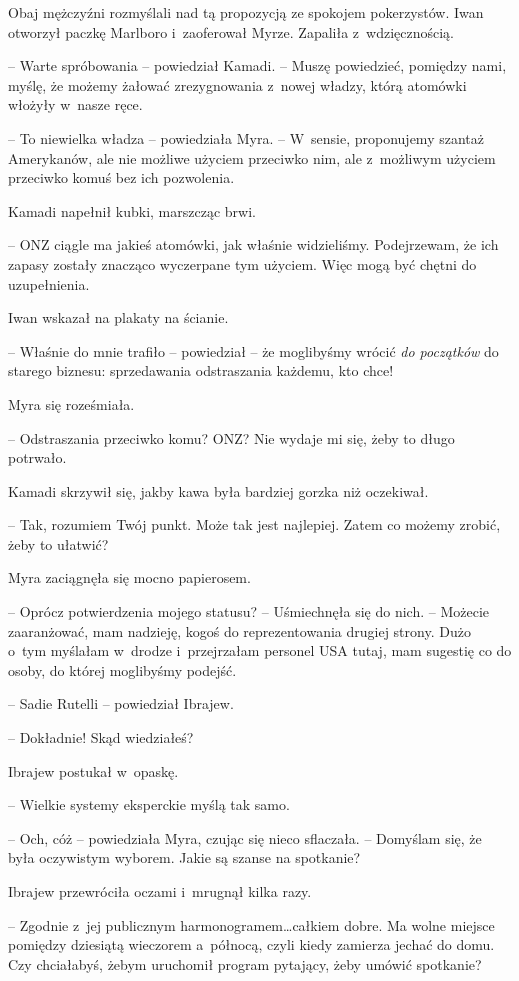 \documentclass[oneside,polish,11pt,sfheadings]{mwbk}
\begin{document}
Obaj mężczyźni rozmyślali nad tą propozycją ze spokojem pokerzystów.
Iwan otworzył paczkę Marlboro i~zaoferował Myrze. Zapaliła z~wdzięcznością.

-- Warte spróbowania -- powiedział Kamadi. -- Muszę powiedzieć, pomiędzy
nami, myślę, że możemy żałować zrezygnowania z~nowej władzy, którą
atomówki włożyły w~nasze ręce.

-- To niewielka władza -- powiedziała Myra. -- W~sensie, proponujemy
szantaż Amerykanów, ale nie możliwe użyciem przeciwko nim, ale z~możliwym użyciem przeciwko komuś bez ich pozwolenia.

Kamadi napełnił kubki, marszcząc brwi. 

-- ONZ ciągle ma jakieś atomówki,
jak właśnie widzieliśmy. Podejrzewam, że ich zapasy zostały znacząco
wyczerpane tym użyciem. Więc mogą być chętni do uzupełnienia.

Iwan wskazał na plakaty na ścianie. 

-- Właśnie do mnie trafiło -- powiedział -- że moglibyśmy wrócić \textit{do początków} do starego
biznesu: sprzedawania odstraszania każdemu, kto chce!

Myra się roześmiała. 

-- Odstraszania przeciwko komu? ONZ? Nie wydaje mi
się, żeby to długo potrwało.

Kamadi skrzywił się, jakby kawa była bardziej gorzka niż oczekiwał. 

-- Tak, rozumiem Twój punkt. Może tak jest najlepiej. Zatem co możemy
zrobić, żeby to ułatwić?

Myra zaciągnęła się mocno papierosem. 

-- Oprócz potwierdzenia mojego
statusu? -- Uśmiechnęła się do nich. -- Możecie zaaranżować, mam nadzieję,
kogoś do reprezentowania drugiej strony. Dużo o~tym myślałam w~drodze i~przejrzałam personel USA tutaj, mam sugestię co do osoby, do której
moglibyśmy podejść.

-- Sadie Rutelli -- powiedział Ibrajew.

-- Dokładnie! Skąd wiedziałeś?

Ibrajew postukał w~opaskę. 

-- Wielkie systemy eksperckie myślą tak samo.

-- Och, cóż -- powiedziała Myra, czując się nieco sflaczała. -- Domyślam
się, że była oczywistym wyborem. Jakie są szanse na spotkanie?

Ibrajew przewróciła oczami i~mrugnął kilka razy. 

-- Zgodnie z~jej
publicznym harmonogramem\ldots całkiem dobre. Ma wolne miejsce pomiędzy
dziesiątą wieczorem a~północą, czyli kiedy zamierza jechać do domu. Czy
chciałabyś, żebym uruchomił program pytający, żeby umówić spotkanie?
\end{document}
